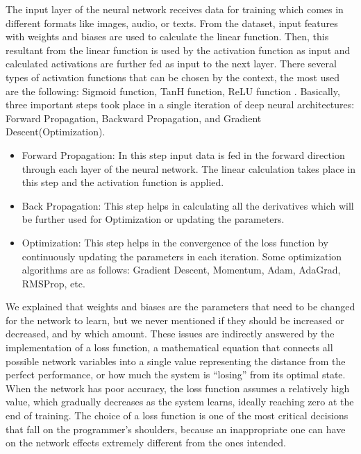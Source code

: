 \documentclass[english, LaM, oneside]{sapthesis}%
\begin{document}
The input layer of the neural network receives data for training which comes in different formats like images, audio, or texts. From the dataset, input features with weights and biases are used to calculate the linear function. Then, this resultant from the linear function is used by the activation function as input and calculated activations are further fed as input to the next layer.
There several types of activation functions that can be chosen by the context, the most used are the following: Sigmoid function, TanH function, ReLU function \cite{act_function}.
\newline \newline
Basically, three important steps took place in a single iteration of deep neural architectures: Forward Propagation, Backward Propagation, and Gradient Descent(Optimization).
\begin{itemize}
\item Forward Propagation: In this step input data is fed in the forward direction through each layer of the neural network. The linear calculation takes place in this step and the activation function is applied.
\item Back Propagation: This step helps in calculating all the derivatives which will be further used for Optimization or updating the parameters.
\item Optimization: This step helps in the convergence of the loss function by continuously updating the parameters in each iteration. Some optimization algorithms are as follows: Gradient Descent, Momentum, Adam, AdaGrad, RMSProp, etc.
\end{itemize}
We explained that weights and biases are the parameters that need to be changed for the network to learn, but we never mentioned if they should be increased or decreased, and by which amount. These issues are indirectly answered by the implementation of a loss function, a mathematical equation that connects all possible network variables into a single value representing the distance from the perfect performance, or how much the system is “losing” from its optimal state. When the network has poor accuracy, the loss function assumes a relatively high value, which gradually decreases as the system learns, ideally reaching zero at the end of training. The choice of a loss function is one of the most critical decisions that fall on the programmer’s shoulders, because an inappropriate one can have on the network effects extremely different from the ones intended. 
\end{document}
